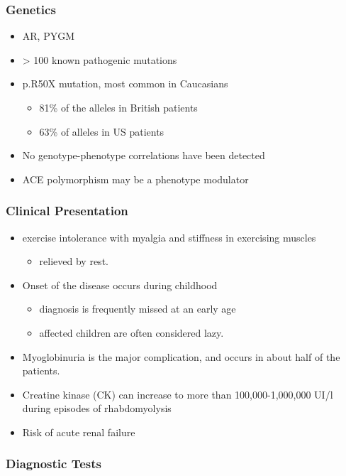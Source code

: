 \documentclass{scrartcl}
\begin{document}
\subsubsection{Genetics}
\label{sec:orgd2dc546}
\begin{itemize}
\item AR, PYGM
\item \textgreater{} 100 known pathogenic mutations
\item p.R50X mutation, most common in Caucasians
\begin{itemize}
\item 81\% of the alleles in British patients
\item 63\% of alleles in US patients
\end{itemize}
\item No genotype-phenotype correlations have been detected
\item ACE polymorphism may be a phenotype modulator
\end{itemize}

\subsubsection{Clinical Presentation}
\label{sec:org26ff416}
\begin{itemize}
\item exercise intolerance with myalgia and stiffness in exercising muscles
\begin{itemize}
\item relieved by rest.
\end{itemize}
\item Onset of the disease occurs during childhood
\begin{itemize}
\item diagnosis is frequently missed at an early age
\item affected children are often considered lazy.
\end{itemize}
\item Myoglobinuria is the major complication, and occurs in about half of
the patients.
\item Creatine kinase (CK) can increase to more than 100,000-1,000,000
UI/l during episodes of rhabdomyolysis
\item Risk of acute renal failure
\end{itemize}

\subsubsection{Diagnostic Tests}
\label{sec:org48c4c56}
\end{document}
